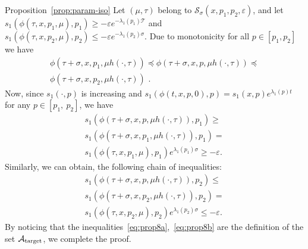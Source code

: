 \documentclass[letterpaper, 10pt, journal]{IEEEtran}  %
\newcommand{\cA}{{\mathcal A}}
\newcommand{\cS}{{\mathcal S}}
\newcommand{\cT}{{\mathcal T}}
\def\QED{\mbox{\rule[0pt]{1.3ex}{1.3ex}}} %
\newenvironment{proof-of}[1]{{\it Proof of #1:\,}}{\hfill\QED\par}
\begin{document}
\begin{proof-of}{Proposition~\ref{prop:param-iso}} 	
	Let $(\mu,\tau)$ belong to $\cS_\sigma(x, p_1, p_2, \varepsilon)$, and let  $s_1(\phi(\tau, x, p_1, \mu), p_1) \ge - \varepsilon e^{ -\lambda_1(p_1)\cT}$  and $s_1(\phi(\tau, x, p_2, \mu), p_2) \le -\varepsilon e^{ -\lambda_1(p_2)\sigma}$. Due to monotonicity for all $p\in [p_1, p_2]$ we have
	\begin{multline*}
	\phi(\tau + \sigma, x, p_1, \mu h(\cdot, \tau)) \preceq  \phi(\tau + \sigma, x, p, \mu h(\cdot, \tau)) \preceq \\ \phi(\tau + \sigma, x, p_2, \mu h(\cdot, \tau))\,\, . 
	\end{multline*}
	Now, since $s_1(\cdot, p)$ is increasing and $s_1(\phi(t,x, p, 0), p) = s_1(x, p) e^{\lambda_1(p) t}$ for any $p\in[p_1,~p_2]$, we have 
	\begin{multline}
	s_1(\phi(\tau + \sigma, x, p, \mu h(\cdot, \tau)), p_1) \ge  \\
	s_1(\phi(\tau + \sigma, x, p_1, \mu h(\cdot, \tau)), p_1) =  \\
	s_1(\phi(\tau , x, p_1, \mu ), p_1) e^{\lambda_1(p_1) \sigma} \ge -\varepsilon. \label{eq:prop8a}
	\end{multline}	
	Similarly, we can obtain, the following chain of inequalities:
	\begin{multline}
	s_1(\phi(\tau + \sigma, x, p, \mu h(\cdot, \tau)), p_2) \le \\
	s_1(\phi(\tau + \sigma, x, p_2, \mu h(\cdot, \tau)), p_2)  =\\
	 s_1(\phi(\tau , x, p_2, \mu), p_2)  e^{\lambda_1(p_2)\sigma} \le -\varepsilon.\label{eq:prop8b}
	\end{multline}
	By noticing that the inequalities~\eqref{eq:prop8a},~\eqref{eq:prop8b}  are the definition of the set $\cA_{\rm target}$, we complete the proof.
\end{proof-of}
\end{document}
